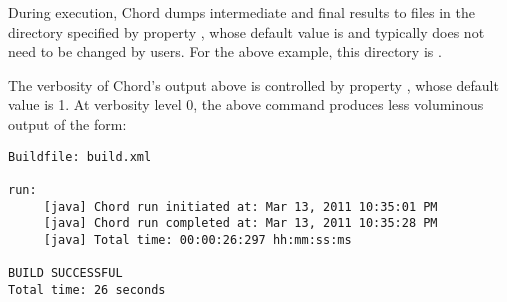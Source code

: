During execution, Chord dumps intermediate and final results to files in the
directory specified by property , whose default value is 
and typically does not need to be changed by users.
For the above example, this directory is .

The verbosity of Chord's output above is controlled by property , whose
default value is 1.  At verbosity level 0, the above command produces less voluminous output
of the form:

\begin{framed}
{\small
\begin{verbatim}
Buildfile: build.xml

run:
     [java] Chord run initiated at: Mar 13, 2011 10:35:01 PM
     [java] Chord run completed at: Mar 13, 2011 10:35:28 PM
     [java] Total time: 00:00:26:297 hh:mm:ss:ms

BUILD SUCCESSFUL
Total time: 26 seconds
\end{verbatim}
}
\end{framed}


